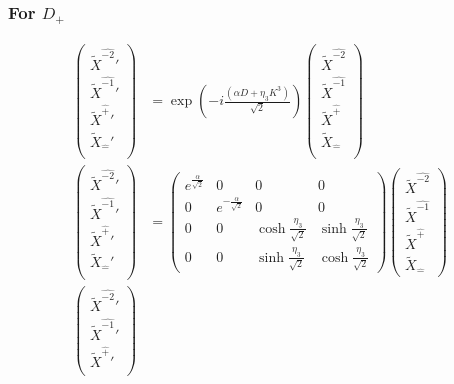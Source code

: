\documentclass[]{article}
\numberwithin{equation}{section}
\begin{document}
{{\subsubsection{For $D_{+}$}
\begin{align}
\begin{pmatrix}
    \tilde{X}^{\hat{-2}}'\\
    \tilde{X}^{\hat{-1}}'\\
    \tilde{X}^{\hat{+}}'\\
    \tilde{X}_{\hat{-}}'\\
    \end{pmatrix}&= \exp{\left(-i\frac{(\alpha D+\eta_{3}K^{3})}{\sqrt{2}}\right)}\begin{pmatrix}
    \tilde{X}^{\hat{-2}}\\
    \tilde{X}^{\hat{-1}}\\
    \tilde{X}^{\hat{+}}\\
    \tilde{X}_{\hat{-}}\\
    \end{pmatrix}\\
    \begin{pmatrix}
    \tilde{X}^{\hat{-2}}'\\
    \tilde{X}^{\hat{-1}}'\\
    \tilde{X}^{\hat{+}}'\\
    \tilde{X}_{\hat{-}}'\\
    \end{pmatrix}&= \begin{pmatrix}
        e^{\frac{\alpha}{\sqrt{2}}}&0&0&0\\
        0&e^{-\frac{\alpha}{\sqrt{2}}}&0&0\\
        0&0&\cosh{\frac{\eta_{3}}{\sqrt{2}}}&\sinh{\frac{\eta_{3}}{\sqrt{2}}}\\
        0&0&\sinh{\frac{\eta_{3}}{\sqrt{2}}}&\cosh{\frac{\eta_{3}}{\sqrt{2}}}
    \end{pmatrix}\begin{pmatrix}
    \tilde{X}^{\hat{-2}}\\
    \tilde{X}^{\hat{-1}}\\
    \tilde{X}^{\hat{+}}\\
    \tilde{X}_{\hat{-}}
    \end{pmatrix}\\
    \begin{pmatrix}
    \tilde{X}^{\hat{-2}}'\\
    \tilde{X}^{\hat{-1}}'\\
    \tilde{X}^{\hat{+}}'\\

\end{pmatrix}
\end{align}}}
\end{document}
